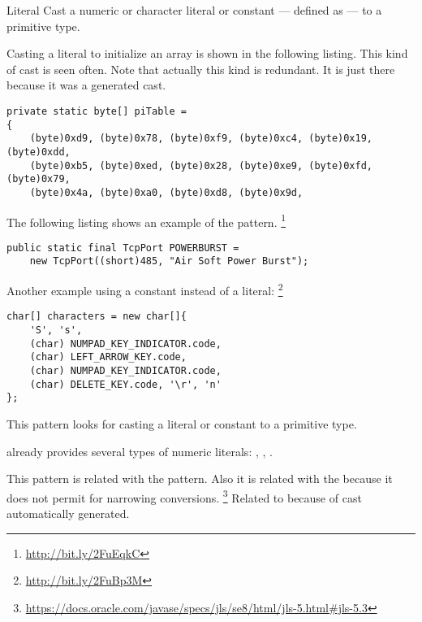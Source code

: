 \begin{pattern}{Literal}
Cast a numeric or character literal or constant --- defined as  ---
to a primitive type.

\instances{}
Casting a literal to initialize an array is shown in the following listing.
This kind of cast is seen often.
Note that actually this kind is redundant.
It is just there because it was a generated cast.
\begin{verbatim}
private static byte[] piTable =
{
    (byte)0xd9, (byte)0x78, (byte)0xf9, (byte)0xc4, (byte)0x19, (byte)0xdd,
    (byte)0xb5, (byte)0xed, (byte)0x28, (byte)0xe9, (byte)0xfd, (byte)0x79,
    (byte)0x4a, (byte)0xa0, (byte)0xd8, (byte)0x9d, 
\end{verbatim}

The following listing shows an example of the  pattern.%
\footnote{\url{http://bit.ly/2FuEqkC}}
\begin{verbatim}
public static final TcpPort POWERBURST =
    new TcpPort((short)485, "Air Soft Power Burst");
\end{verbatim}

Another example using a constant instead of a literal:%
\footnote{\url{http://bit.ly/2FuBp3M}}

\begin{verbatim}
char[] characters = new char[]{
    'S', 's',
    (char) NUMPAD_KEY_INDICATOR.code,
    (char) LEFT_ARROW_KEY.code,
    (char) NUMPAD_KEY_INDICATOR.code,
    (char) DELETE_KEY.code, '\r', 'n'
};
\end{verbatim}

\detection{}
This pattern looks for casting a literal or constant to a primitive type.

\discussion{}
\java{} already provides several types of numeric literals:
, , .

This pattern is related with the  pattern.
Also it is related with the 
because it does not permit for narrowing conversions.%
\footnote{\url{https://docs.oracle.com/javase/specs/jls/se8/html/jls-5.html\#jls-5.3}}
Related to  because of cast automatically generated.
\end{pattern}